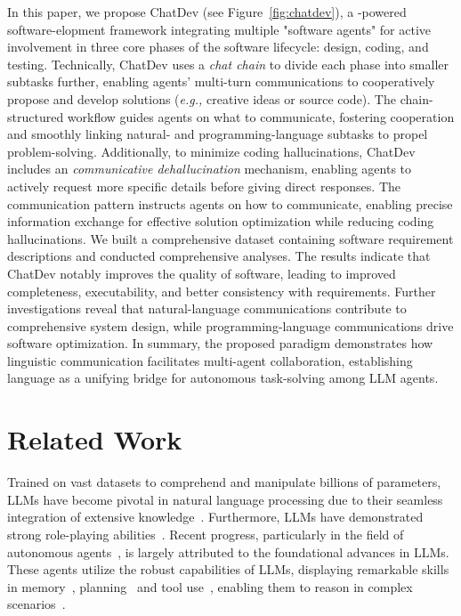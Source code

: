 \documentclass[11pt]{article}
\newcommand{\eg}{\textit{e.g., }}
\begin{document}
In this paper, we propose ChatDev (see Figure~\ref{fig:chatdev}), a -powered software-elopment framework integrating multiple "software agents" for active involvement in three core phases of the software lifecycle: design, coding, and testing.
Technically, ChatDev uses a \textit{chat chain} to divide each phase into smaller subtasks further, enabling agents' multi-turn communications to cooperatively propose and develop solutions (\eg creative ideas or source code).
The chain-structured workflow guides agents on what to communicate, fostering cooperation and smoothly linking natural- and programming-language subtasks to propel problem-solving.
Additionally, to minimize coding hallucinations, ChatDev includes an \textit{communicative dehallucination} mechanism, enabling agents to actively request more specific details before giving direct responses.
The communication pattern instructs agents on how to communicate, enabling precise information exchange for effective solution optimization while reducing coding hallucinations.
We built a comprehensive dataset containing software requirement descriptions and conducted comprehensive analyses.
The results indicate that ChatDev notably improves the quality of software, leading to improved completeness, executability, and better consistency with requirements.
Further investigations reveal that natural-language communications contribute to comprehensive system design, while programming-language communications drive software optimization.
In summary, the proposed paradigm demonstrates how linguistic communication facilitates multi-agent collaboration, establishing language as a unifying bridge for autonomous task-solving among LLM agents.


\section{Related Work}
Trained on vast datasets to comprehend and manipulate billions of parameters, LLMs have become pivotal in natural language processing due to their seamless integration of extensive knowledge~\cite{NEURIPS2020_1457c0d6,bubeck2023sparks,vaswani2017attention,radford2019language,touvron2023llama,wei2022emergent,Shanahan2023,chen2021evaluating,brants2007large,chen2021evaluating,ouyang2022training,yang2023large,qin2023large,kaplan2020scaling}.
Furthermore, LLMs have demonstrated strong role-playing abilities~\cite{li2023camel,park2023generative,hua2023war,chan2023chateval,zhou2023agents,chen2023agentverse,chen2023gamegpt,Cohen2023LMVL,Li2023MetaAgentsSI}. 
Recent progress, particularly in the field of autonomous agents~\cite{zhou2023webarena,wang2023voyager,park2023generative,wang2023humanoid,AutoGPT,GPTEngineer,wang2023promptagent}, is largely attributed to the foundational advances in LLMs. These agents utilize the robust capabilities of LLMs, displaying remarkable skills in memory~\cite{park2023generative,sumers2023cognitive}, planning~\cite{chen2023agentverse,liu2023bolaa} and tool use~\cite{schick2023toolformer,cai2023large,qin2023toolllm,ruan2023tptu,GPT4Tools}, enabling them to reason in complex scenarios~\cite{wei2022chain,zhao2023expel,zhou2023webarena,ma2023laser,zhang2023generative,wang2023large,ding2023designgpt,weng2023prompt}.
\end{document}
